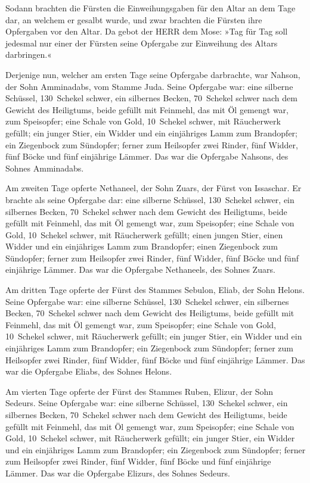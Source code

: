 Sodann brachten die Fürsten die Einweihungsgaben für den
Altar an dem Tage dar, an welchem er gesalbt wurde, und zwar brachten
die Fürsten ihre Opfergaben vor den Altar. Da gebot der
HERR dem Mose: »Tag für Tag soll jedesmal nur einer der Fürsten seine
Opfergabe zur Einweihung des Altars darbringen.«

Derjenige nun, welcher am ersten Tage seine Opfergabe
darbrachte, war Nahson, der Sohn Amminadabs, vom Stamme Juda.
Seine Opfergabe war: eine silberne Schüssel, 130~Schekel
schwer, ein silbernes Becken, 70~Schekel schwer nach dem Gewicht des
Heiligtums, beide gefüllt mit Feinmehl, das mit Öl gemengt war, zum
Speisopfer; eine Schale von Gold, 10~Schekel schwer, mit
Räucherwerk gefüllt; ein junger Stier, ein Widder und ein
einjähriges Lamm zum Brandopfer; ein Ziegenbock zum
Sündopfer; ferner zum Heilsopfer zwei Rinder, fünf
Widder, fünf Böcke und fünf einjährige Lämmer. Das war die Opfergabe
Nahsons, des Sohnes Amminadabs.

Am zweiten Tage opferte Nethaneel, der Sohn Zuars, der
Fürst von Issaschar. Er brachte als seine Opfergabe dar:
eine silberne Schüssel, 130~Schekel schwer, ein silbernes Becken,
70~Schekel schwer nach dem Gewicht des Heiligtums, beide gefüllt mit
Feinmehl, das mit Öl gemengt war, zum Speisopfer; eine
Schale von Gold, 10~Schekel schwer, mit Räucherwerk gefüllt;
einen jungen Stier, einen Widder und ein einjähriges Lamm
zum Brandopfer; einen Ziegenbock zum Sündopfer;
ferner zum Heilsopfer zwei Rinder, fünf Widder, fünf
Böcke und fünf einjährige Lämmer. Das war die Opfergabe Nethaneels, des
Sohnes Zuars.

Am dritten Tage opferte der Fürst des Stammes Sebulon,
Eliab, der Sohn Helons. Seine Opfergabe war: eine
silberne Schüssel, 130~Schekel schwer, ein silbernes Becken, 70~Schekel
schwer nach dem Gewicht des Heiligtums, beide gefüllt mit Feinmehl, das
mit Öl gemengt war, zum Speisopfer; eine Schale von Gold,
10~Schekel schwer, mit Räucherwerk gefüllt; ein junger
Stier, ein Widder und ein einjähriges Lamm zum Brandopfer;
ein Ziegenbock zum Sündopfer; ferner zum
Heilsopfer zwei Rinder, fünf Widder, fünf Böcke und fünf einjährige
Lämmer. Das war die Opfergabe Eliabs, des Sohnes Helons.

Am vierten Tage opferte der Fürst des Stammes Ruben,
Elizur, der Sohn Sedeurs. Seine Opfergabe war: eine
silberne Schüssel, 130~Schekel schwer, ein silbernes Becken, 70~Schekel
schwer nach dem Gewicht des Heiligtums, beide gefüllt mit Feinmehl, das
mit Öl gemengt war, zum Speisopfer; eine Schale von Gold,
10~Schekel schwer, mit Räucherwerk gefüllt; ein junger
Stier, ein Widder und ein einjähriges Lamm zum Brandopfer;
ein Ziegenbock zum Sündopfer; ferner zum
Heilsopfer zwei Rinder, fünf Widder, fünf Böcke und fünf einjährige
Lämmer. Das war die Opfergabe Elizurs, des Sohnes Sedeurs.

